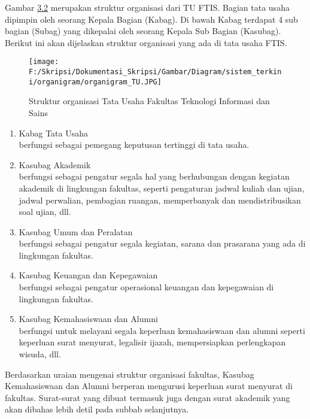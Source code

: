 Gambar \hyperlink{organigram_TU}{3.2} merupakan struktur organisasi dari TU FTIS. Bagian tata usaha dipimpin oleh seorang Kepala Bagian (Kabag). Di bawah Kabag terdapat 4 sub bagian (Subag) yang dikepalai oleh seorang Kepala Sub Bagian (Kasubag). Berikut ini akan dijelaskan struktur organisasi yang ada di tata usaha FTIS.
\begin{figure}[H]
	\centering
		\texttt{[image: F:/Skripsi/Dokumentasi\_Skripsi/Gambar/Diagram/sistem\_terkini/organigram/organigram\_TU.JPG]}
	\caption{Struktur organisasi Tata Usaha Fakultas Teknologi Informasi dan Sains}
	\label{fig:organigram_TU}
\end{figure}
\begin{enumerate}
	\item Kabag Tata Usaha \\
	berfungsi sebagai pemegang keputusan tertinggi di tata usaha.
	\item Kasubag Akademik \\
	berfungsi sebagai pengatur segala hal yang berhubungan dengan kegiatan akademik di lingkungan fakultas, seperti pengaturan jadwal kuliah dan ujian, jadwal perwalian, pembagian ruangan, memperbanyak dan mendistribusikan soal ujian, dll.
	\item Kasubag Umum dan Peralatan \\
	berfungsi sebagai pengatur segala kegiatan, sarana dan prasarana yang ada di lingkungan fakultas. 
	\item Kasubag Keuangan dan Kepegawaian \\
	berfungsi sebagai pengatur operasional keuangan dan kepegawaian di lingkungan fakultas.
	\item Kasubag Kemahasiswaan dan Alumni \\
	berfungsi untuk melayani segala keperluan kemahasiswaan dan alumni seperti keperluan surat menyurat, legalisir ijazah, mempersiapkan perlengkapan wisuda, dll.
\end{enumerate}
Berdasarkan uraian mengenai struktur organisasi fakultas, Kasubag Kemahasiswaan dan Alumni berperan mengurusi keperluan surat menyurat di fakultas. Surat-surat yang dibuat termasuk juga dengan surat akademik yang akan dibahas lebih detil pada subbab selanjutnya.

